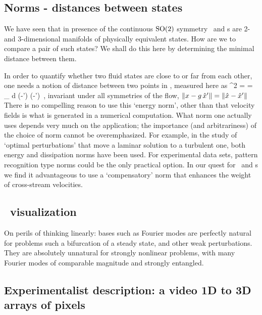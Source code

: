 \subsection{Norms - distances between states}

We have seen that in presence of the continuous $\textrm{SO}(2)$ symmetry
\reqva\ and \rpo s are 2- and 3-dimensional manifolds of physically
equivalent states. How are we to compare a pair of such states? We shall
do this here by determining the minimal distance between them.

In order to quantify
whether two fluid states are close to or far from each other, one
needs a notion of distance between two points in \statesp, measured
here as
\beq
  ^2  =  =
\int_\bCell \! d \bx \;
(-') \cdot (-')
\,,
invariant under all symmetries of the flow,
$\|{x-g\,{\hat{x}'}}\|=\|{\hat{x}-{\hat{x}'}}\|$
There is no compelling reason to use this {`energy norm'}, other than
that velocity fields is what is generated in a numerical
computation. What norm one actually uses depends very much on the
application; the importance (and arbitrariness) of the choice of
norm cannot be overemphasized. For example, in the study of `optimal perturbations' that
move a laminar solution to a turbulent one, both energy
\citep{TeHaHe10} and dissipation \citep{LoCaCoPeGo11} norms have been
used.
For experimental data sets, pattern recognition type norms could be the
only practical option.
In our quest for \reqva\ and \rpo s we
find it advantageous to use a `compensatory' norm 
that enhances the weight of cross-stream velocities.


\subsection{\Statesp\ visualization}

On perils of thinking linearly: bases such as Fourier modes are
perfectly natural for problems such a bifurcation of a steady state, and
other weak perturbations. They are absolutely unnatural for strongly
nonlinear problems, with many Fourier modes of comparable magnitude and
strongly entangled.

\subsection{\CLe}
\subsection{Experimentalist description: a video 1D to 3D arrays of pixels}
